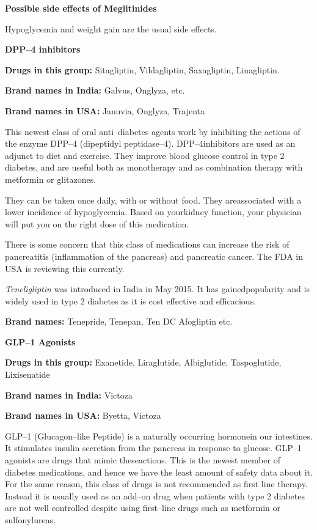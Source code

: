 \vskip 4pt
\noindent\textbf{Possible side effects of Meglitinides}
\vskip 4pt

Hypoglycemia and weight gain are the usual side effects.

\textbf{DPP–4 inhibitors}

\textbf{Drugs in this group:} Sitagliptin, Vildagliptin, Saxagliptin, Linag\-liptin.

\textbf{Brand names in India:} Galvus, Onglyza, etc.

\textbf{Brand names in USA:} Januvia, Onglyza, Trajenta


This newest class of oral anti–diabetes agents work by inhibi\-ting the actions of the enzyme DPP–4 (dipeptidyl peptidase–4). DPP–4\break inhibitors are used as an adjunct to diet and exercise. They improve blood glucose control in type 2 diabetes, and are useful both as mono\-therapy and as combination therapy with metformin or glitazones.

They can be taken once daily, with or without food. They are\break associated with a lower incidence of hypoglycemia. Based on your\break kidney function, your physician will put you on the right dose of this medication.

There is some concern that this class of medications can increase the risk of pancreatitis (inflammation of the pancreas) and pancreatic cancer. The FDA in USA is reviewing this currently.

\textit{Teneligliptin} was introduced in India in May 2015. It has gained\break popularity and is widely used in type 2 diabetes as it is cost effective and efficacious.

\textbf{Brand names:} Tenepride, Tenepan, Ten DC Afogliptin etc.

\textbf{GLP–1 Agonists}

\textbf{Drugs in this group:} Exanetide, Liraglutide, Albiglutide, Taspo\-glutide, Lixisenatide

\textbf{Brand names in India:} Victoza

\textbf{Brand names in USA:} Byetta, Victoza



GLP–1 (Glucagon–like Peptide) is a naturally occurring hormone\break in our intestines. It stimulates insulin secretion from the pancreas in response to glucose. GLP–1 agonists are drugs that mimic these\break actions. This is the newest member of diabetes medications, and hence we have the least amount of safety data about it. For the same reason, this class of drugs is not recommended as first line therapy. Instead it is usually used as an add–on drug when patients with type 2 diabetes are not well controlled despite using first–line drugs such as metformin or sulfonylureas.



